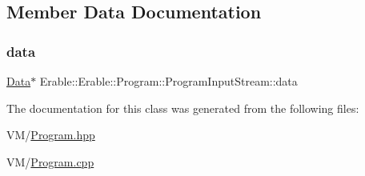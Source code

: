 \subsection{Member Data Documentation}
\mbox{\label{class_erable_1_1_erable_1_1_program_1_1_program_input_stream_a61bf88598cb82fe5fdf78c21aaf8cb35}} 
\subsubsection{\texorpdfstring{data}{data}}
{\footnotesize\ttfamily \mbox{\hyperlink{struct_erable_1_1_erable_1_1_program_1_1_data}{Data}}$\ast$ Erable\+::\+Erable\+::\+Program\+::\+Program\+Input\+Stream\+::data\hspace{0.3cm}{\ttfamily [private]}}



The documentation for this class was generated from the following files\+:\begin{DoxyCompactItemize}
\item 
V\+M/\mbox{\hyperlink{_program_8hpp}{Program.\+hpp}}\item 
V\+M/\mbox{\hyperlink{_program_8cpp}{Program.\+cpp}}\end{DoxyCompactItemize}
